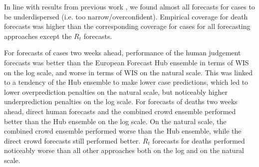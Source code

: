 \documentclass[10pt,a4paper,twocolumn]{article}
\begin{document}
In line with results from previous work \citep{bosseComparingHumanModelbased2022, sherrattPredictivePerformanceMultimodel2022a}, we found almost all forecasts for cases to be underdispersed (i.e. too narrow/overconfident). Empirical coverage for death forecasts was higher than the corresponding coverage for cases for all forecasting approaches except the $R_t$ forecasts. 

For forecasts of cases two weeks ahead, performance of the human judgement forecasts was better than the European Forecast Hub ensemble in terms of WIS on the log scale, and worse in terms of WIS on the natural scale. This was linked to a tendency of the Hub ensemble to make lower case predictions, which led to lower overprediction penalties on the natural scale, but noticeably higher underprediction penalties on the log scale. 
For forecasts of deaths two weeks ahead, direct human forecasts and the combined crowd ensemble performed better than the Hub ensemble on the log scale. On the natural scale, the combined crowd ensemble performed worse than the Hub ensemble, while the direct crowd forecasts still performed better. $R_t$ forecasts for deaths performed noticeably worse than all other approaches both on the log and on the natural scale. 
\end{document}
